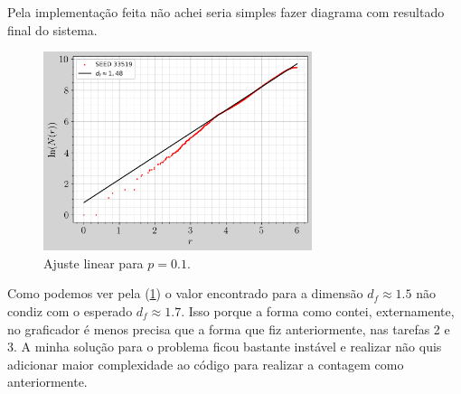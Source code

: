 \documentclass[a4paper, 11pt]{tufte-handout}
\begin{document}
Pela implementação feita não achei seria simples fazer diagrama com resultado final do sistema.

\begin{figure}[h!]
  \centering
  \includegraphics[width=0.7\textwidth]{tarefa-5/rev_popular.png}
  \caption{Ajuste linear para $p = 0.1$.}
  \label{fig:rev_popular}
\end{figure}


Como podemos ver pela (\ref{fig:rev_popular}) o valor encontrado para a dimensão \( d_f \approx 1.5 \)
não condiz com o esperado \( d_f \approx 1.7 \). Isso porque a forma como contei, externamente, no
graficador é menos precisa que a forma que fiz anteriormente, nas tarefas 2 e 3. A minha solução
para o problema ficou bastante instável e realizar não quis adicionar maior complexidade ao código
para realizar a contagem como anteriormente.
\end{document}
